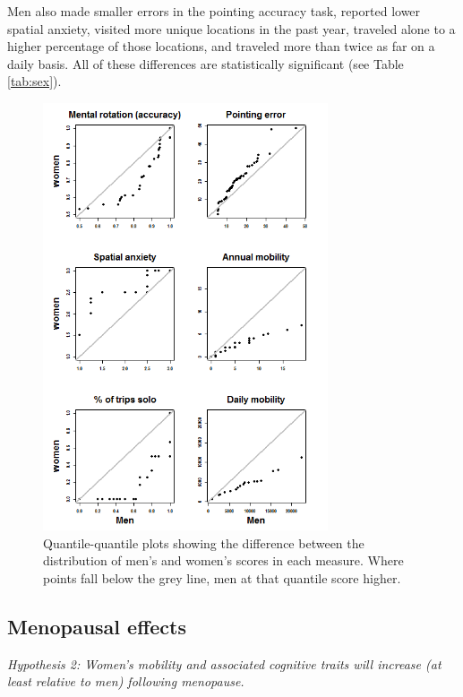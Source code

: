 Men also made smaller errors in the pointing accuracy task, reported lower spatial anxiety, visited more unique locations in the past year, traveled alone to a higher percentage of those locations, and traveled more than twice as far on a daily basis.  All of these differences are statistically significant (see Table \ref{tab:sex}).

\begin{figure}[!htb]
  \includegraphics[width=0.75\textwidth]{QQ_sex}
\caption{Quantile-quantile plots showing the difference between the distribution of men's and women's scores in each measure. Where points fall below the grey line, men at that quantile score higher.}
\label{fig:sex}       %
\end{figure}


	\subsection{Menopausal effects}
	\label{sec:3.2}
	
\emph{Hypothesis 2: Women's mobility and associated cognitive traits will increase (at least relative to men) following menopause.}	
\smallskip
	
